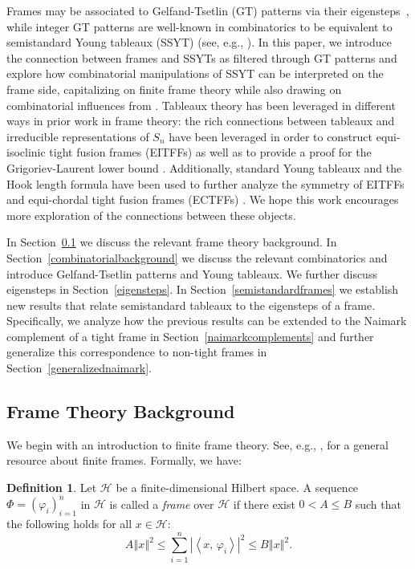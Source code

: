 \documentclass[10pt]{article}
\theoremstyle{plain}
\theoremstyle{definition}
\newtheorem{definition}[thm]{Definition}
\renewcommand{\phi}{\varphi}
\newcommand{\cH}{\mathcal{H}}
\newcommand{\norm}[1]{\left\Vert#1\right\Vert}
\newcommand{\absip}[2]{\left\vert\left<#1,\,#2\right>\right\vert}
\begin{document}
Frames may be associated to Gelfand-Tsetlin (GT) patterns via their eigensteps~\cite{cfmconstructingfiniteframes, cfpconstructingselfadjoint,HPpolytope}, while integer GT patterns are well-known in combinatorics to be equivalent to semistandard Young tableaux (SSYT) (see, e.g., \cite{Stanleycombinatorics}).  In this paper, we introduce the connection between frames and SSYTs as filtered through GT patterns and explore how combinatorial manipulations of SSYT can be interpreted on the frame side, capitalizing on finite frame theory while also drawing on combinatorial influences from \cite{FultonTableaux, GTpatterns}. Tableaux theory has been leveraged in different ways in prior work in frame theory: the rich connections between tableaux and irreducible representations of $S_n$ have been leveraged in order to construct equi-isoclinic tight fusion frames (EITFFs) as well as to provide a proof for the Grigoriev-Laurent lower bound \cite{fickus2022note, kunisky2024spectrum,}. Additionally, standard Young tableaux and the Hook length formula have been used to further analyze the symmetry of EITFFs and equi-chordal tight fusion frames (ECTFFs) \cite{fickus2024equi}. We hope this work encourages more exploration of the connections between these objects.

In Section~\ref{frametheorybackground} we discuss the relevant frame theory background. In Section~\ref{combinatorialbackground} we discuss the relevant combinatorics and introduce Gelfand-Tsetlin patterns and Young tableaux.  We further discuss eigensteps in Section~\ref{eigensteps}. In Section~\ref{semistandardframes} we establish new results that relate semistandard tableaux to the eigensteps of a frame. Specifically, we analyze how the previous results can be extended to the Naimark complement of a tight frame in Section~\ref{naimarkcomplements} and further generalize this correspondence to non-tight frames in Section~\ref{generalizednaimark}.


\subsection{Frame Theory Background}\label{frametheorybackground}
We begin with an introduction to finite frame theory. See, e.g., \cite{Waldron18}, for a general resource about finite frames.  Formally, we have:

\begin{definition}\label{framedef}
Let $\cH$ be a finite-dimensional Hilbert space. A sequence $\Phi =  \left(\phi_i\right)_{i=1}^n$ in $\cH$ is called a \emph{frame} over $\cH$ if there exist $0 < A \leq B$ such that the following holds for all $x \in \cH$:
\[
    A\norm{x}^2 \leq \sum_{i=1}^n \absip{x}{\phi_i}^2 \leq B\norm{x}^2.
\]

\end{definition}
\end{document}
